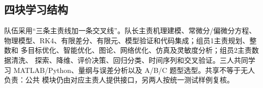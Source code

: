 \subsection{四块学习结构}

队伍采用“三条主责线加一条交叉线”。队长主责机理建模、常微分/偏微分方程、
物理模型、RK4、有限差分、有限元、模型验证和代码集成；组员1主责规划、整数和
多目标优化、智能优化、图论、网络优化、仿真及灵敏度分析；组员2主责数据清洗、
探索、降维、评价决策、回归分类、时间序列和交叉验证。三人共同学习
MATLAB/Python、量纲与误差分析以及 A/B/C 题型选型。共享不等于无人负责：公共
模块仍由对应主责人提供接口，另两人按统一测试样例复核。

